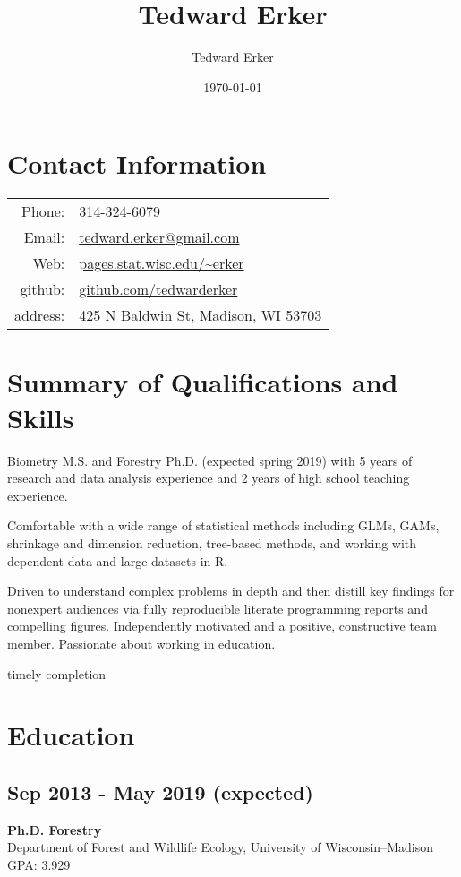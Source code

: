 \documentclass{article}
\author{Tedward Erker}
\date{\today}
\title{Tedward Erker}
\begin{document}
\maketitle
\section*{Contact Information}
\label{sec:orgff78083}
\begin{center}
\begin{tabular}{rp{}}
Phone: & 314-324-6079\\
Email: & \href{mailto:erker@wisc.edu}{tedward.erker@gmail.com}\\
Web: & \href{http://pages.stat.wisc.edu/\~erker/}{pages.stat.wisc.edu/\textasciitilde{}erker}\\
github: & \href{https://github.com/tedwarderker}{github.com/tedwarderker}\\
address: & 425 N Baldwin St, Madison, WI 53703\\
\end{tabular}
\end{center}


\section*{Summary of Qualifications and Skills}
\label{sec:orgbb4280c}

Biometry M.S. and Forestry Ph.D. (expected spring 2019) with 5 years
of research and data analysis experience and 2 years of high school
teaching experience.

Comfortable with a wide range of statistical
methods including GLMs, GAMs, shrinkage and dimension reduction,
tree-based methods, and working with dependent data and large datasets
in R.

Driven to understand complex problems in depth and then distill
key findings for nonexpert audiences via fully reproducible literate
programming reports and compelling figures.  Independently motivated
and a positive, constructive team member.  Passionate about working in
education.

timely completion

\section*{Education}
\label{sec:orgf0b5e8c}
\subsection*{Sep 2013 - May 2019 (expected)}
\label{sec:org56d4325}
\textbf{Ph.D. Forestry} \\
Department of Forest and Wildlife Ecology, University of Wisconsin--Madison \\
GPA: 3.929
\end{document}
